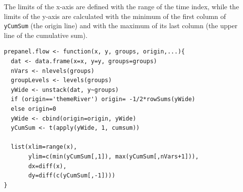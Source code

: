 The limits of the x-axis are defined with the range of the time index,
while the limits of the y-axis are calculated with the minimum of the
first column of \texttt{yCumSum} (the origin line) and with the maximum of
its last column (the upper line of the cumulative sum).

\lstset{language=R,numbers=none}
\begin{lstlisting}
prepanel.flow <- function(x, y, groups, origin,...){
  dat <- data.frame(x=x, y=y, groups=groups)
  nVars <- nlevels(groups)
  groupLevels <- levels(groups)
  yWide <- unstack(dat, y~groups)
  if (origin=='themeRiver') origin= -1/2*rowSums(yWide)
  else origin=0
  yWide <- cbind(origin=origin, yWide)
  yCumSum <- t(apply(yWide, 1, cumsum))

  list(xlim=range(x),
       ylim=c(min(yCumSum[,1]), max(yCumSum[,nVars+1])),
       dx=diff(x),
       dy=diff(c(yCumSum[,-1])))
}
\end{lstlisting}
